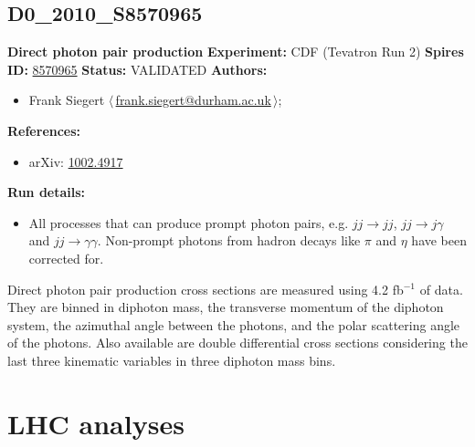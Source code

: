 \subsection[D0\_2010\_S8570965]{D0\_2010\_S8570965\,\cite{Abazov:2010ah}}
\textbf{Direct photon pair production}\newline
\textbf{Experiment:} CDF (Tevatron Run 2) \newline
\textbf{Spires ID:} \href{http://www.slac.stanford.edu/spires/find/hep/www?rawcmd=key+8570965}{8570965}\newline
\textbf{Status:} VALIDATED\newline
\textbf{Authors:}
\begin{itemize}
  \item Frank Siegert $\langle\,$\href{mailto:frank.siegert@durham.ac.uk}{frank.siegert@durham.ac.uk}$\,\rangle$;
\end{itemize}
\textbf{References:}
\begin{itemize}
  \item arXiv: \href{http://arxiv.org/abs/1002.4917}{1002.4917}
\end{itemize}
\textbf{Run details:}
\begin{itemize}

  \item All processes that can produce prompt photon pairs, e.g. $jj \to jj$, $jj \to j\gamma$ and $jj \to \gamma \gamma$. Non-prompt photons from hadron decays like $\pi$ and $\eta$ have been corrected for.\end{itemize}

\noindent Direct photon pair production cross sections are measured using 4.2 fb$^{-1}$ of data. They are binned in diphoton mass, the transverse momentum of the diphoton system, the azimuthal angle between the photons, and the polar scattering angle of the photons. Also available are double differential cross sections considering the last three kinematic variables in three diphoton mass bins.

\clearpage


\section{LHC analyses}
